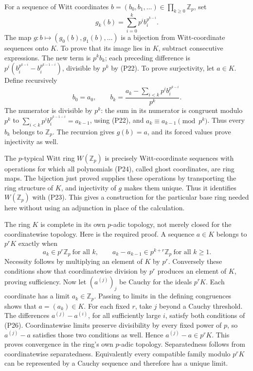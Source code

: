 \documentclass[
]{article}
\begin{document}
For a sequence of Witt coordinates
\(b=(b_0,b_1,\ldots)\in\prod_{k\ge0}\mathbb Z_p\), set \[
g_k(b)=\sum_{i=0}^k p^i b_i^{p^{k-i}}.
\tag{P24}
\] The map \(g:b\mapsto(g_0(b),g_1(b),\ldots)\) is a bijection from
Witt-coordinate sequences onto \(K\). To prove that its image lies in
\(K\), subtract consecutive expressions. The new term is \(p^k b_k\);
each preceding difference is \(p^i(b_i^{p^{k-i}}-b_i^{p^{k-1-i}})\),
divisible by \(p^k\) by (P22). To prove surjectivity, let \(a\in K\).
Define recursively \[
b_0=a_0,\qquad
b_k=\frac{a_k-\sum_{i<k}p^i b_i^{p^{k-i}}}{p^k}.
\tag{P25}
\] The numerator is divisible by \(p^k\): the sum in its numerator is
congruent modulo \(p^k\) to \(\sum_{i<k}p^i b_i^{p^{k-1-i}}=a_{k-1}\),
using (P22), and \(a_k\equiv a_{k-1}\pmod{p^k}\). Thus every \(b_k\)
belongs to \(\mathbb Z_p\). The recursion gives \(g(b)=a\), and its
forced values prove injectivity as well.

The \(p\)-typical Witt ring \(W(\mathbb Z_p)\) is precisely
Witt-coordinate sequences with operations for which all polynomials
(P24), called ghost coordinates, are ring maps. The bijection just
proved supplies these operations by transporting the ring structure of
\(K\), and injectivity of \(g\) makes them unique. Thus it identifies
\(W(\mathbb Z_p)\) with (P23). This gives a construction for the
particular base ring needed here without using an adjunction in place of
the calculation.

The ring \(K\) is complete in its own \(p\)-adic topology, not merely
closed for the coordinatewise topology. Here is the required proof. A
sequence \(a\in K\) belongs to \(p^rK\) exactly when \[
a_k\in p^r\mathbb Z_p\ \text{for all }k,
\qquad a_k-a_{k-1}\in p^{k+r}\mathbb Z_p\ \text{for all }k\ge1.
\tag{P26}
\] Necessity follows by multiplying an element of \(K\) by \(p^r\).
Conversely these conditions show that coordinatewise division by \(p^r\)
produces an element of \(K\), proving sufficiency. Now let
\((a^{(j)})_j\) be Cauchy for the ideals \(p^rK\). Each coordinate has a
limit \(a_k\in\mathbb Z_p\). Passing to limits in the defining
congruences shows that \(a=(a_k)\in K\). For each fixed \(r\), take
\(j\) beyond a Cauchy threshold. The differences \(a^{(j)}-a^{(i)}\),
for all sufficiently large \(i\), satisfy both conditions of (P26).
Coordinatewise limits preserve divisibility by every fixed power of
\(p\), so \(a^{(j)}-a\) satisfies those two conditions as well. Hence
\(a^{(j)}-a\in p^rK\). This proves convergence in the ring's own
\(p\)-adic topology. Separatedness follows from coordinatewise
separatedness. Equivalently every compatible family modulo \(p^rK\) can
be represented by a Cauchy sequence and therefore has a unique limit.
\end{document}
